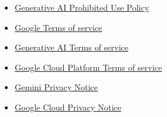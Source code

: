 \begin{itemize}
\item \href{https://policies.google.com/terms/generative-ai/use-policy}{Generative AI Prohibited Use Policy}
\item \href{https://policies.google.com/terms}{Google Terms of service} 
\item \href{https://policies.google.com/terms/generative-ai}{Generative AI Terms of service}
\item \href{https://cloud.google.com/terms}{Google Cloud Platform Terms of service}
\item \href{https://support.google.com/gemini?p=privacy_notice}{Gemini Privacy Notice}
\item \href{https://cloud.google.com/terms/cloud-privacy-notice}{Google Cloud Privacy Notice}
\end{itemize}
